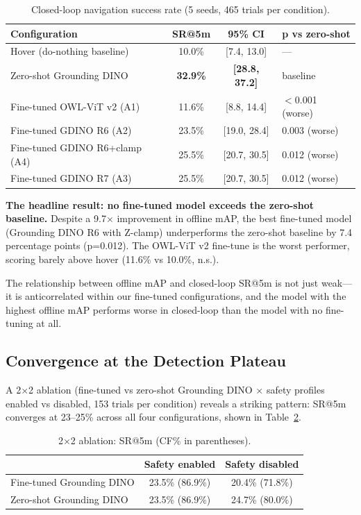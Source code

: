 \documentclass{article}
\begin{document}
\begin{table}[h]
\centering
\caption{Closed-loop navigation success rate (5 seeds, 465 trials per condition).}
\label{tab:closedloop}
\begin{tabular}{lccl}
\toprule
Configuration & SR@5m & 95\% CI & p vs zero-shot \\
\midrule
Hover (do-nothing baseline) & 10.0\% & [7.4, 13.0] & --- \\
Zero-shot Grounding DINO & \textbf{32.9\%} & \textbf{[28.8, 37.2]} & baseline \\
Fine-tuned OWL-ViT v2 (A1) & 11.6\% & [8.8, 14.4] & $<$0.001 (worse) \\
Fine-tuned GDINO R6 (A2) & 23.5\% & [19.0, 28.4] & 0.003 (worse) \\
Fine-tuned GDINO R6+clamp (A4) & 25.5\% & [20.7, 30.5] & 0.012 (worse) \\
Fine-tuned GDINO R7 (A3) & 25.5\% & [20.7, 30.5] & 0.012 (worse) \\
\bottomrule
\end{tabular}
\end{table}

\textbf{The headline result: no fine-tuned model exceeds the zero-shot baseline.} Despite a 9.7$\times$ improvement in offline mAP, the best fine-tuned model (Grounding DINO R6 with Z-clamp) underperforms the zero-shot baseline by 7.4 percentage points (p=0.012). The OWL-ViT v2 fine-tune is the worst performer, scoring barely above hover (11.6\% vs 10.0\%, n.s.).

The relationship between offline mAP and closed-loop SR@5m is not just weak---it is anticorrelated within our fine-tuned configurations, and the model with the highest offline mAP performs worse in closed-loop than the model with no fine-tuning at all.

\subsection{Convergence at the Detection Plateau}

A 2$\times$2 ablation (fine-tuned vs zero-shot Grounding DINO $\times$ safety profiles enabled vs disabled, 153 trials per condition) reveals a striking pattern: SR@5m converges at 23--25\% across all four configurations, shown in Table~\ref{tab:ablation}.

\begin{table}[h]
\centering
\caption{2$\times$2 ablation: SR@5m (CF\% in parentheses).}
\label{tab:ablation}
\begin{tabular}{lcc}
\toprule
& Safety enabled & Safety disabled \\
\midrule
Fine-tuned Grounding DINO & 23.5\% (86.9\%) & 20.4\% (71.8\%) \\
Zero-shot Grounding DINO & 23.5\% (86.9\%) & 24.7\% (80.0\%) \\
\bottomrule
\end{tabular}
\end{table}
\end{document}
